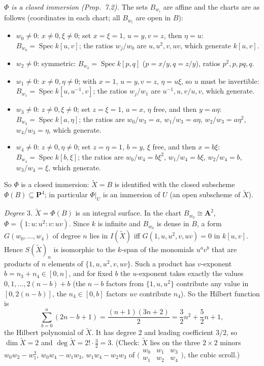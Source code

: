 \documentclass[11pt]{article}
\begin{document}
\emph{$\Phi$ is a closed immersion (Prop.~7.2).} The sets $B_{w_i}$ are affine and the charts are as follows (coordinates in each chart; all $B_{w_i}$ are open in $B$):
\begin{itemize}
\item $w_0\ne0$: $x\ne0,\xi\ne0$; set $x=\xi=1$, $u=y,v=z$, then $\eta=u$: $B_{w_0}=\operatorname{Spec}k[u,v]$; the ratios $w_j/w_0$ are $u,u^2,v,uv$, which generate $k[u,v]$.
\item $w_2\ne0$: symmetric: $B_{w_2}=\operatorname{Spec}k[p,q]$ ($p=x/y,q=z/y$), ratios $p^2,p,pq,q$.
\item $w_1\ne0$: $x\ne0,\eta\ne0$; with $x=1$, $u=y,v=z$, $\eta=u\xi$, so $u$ must be invertible: $B_{w_1}=\operatorname{Spec}k[u,u^{-1},v]$; the ratios $w_j/w_1$ are $u^{-1},u,v/u,v$, which generate.
\item $w_3\ne0$: $z\ne0,\xi\ne0$; set $z=\xi=1$, $a=x$, $\eta$ free, and then $y=a\eta$: $B_{w_3}=\operatorname{Spec}k[a,\eta]$; the ratios are $w_0/w_3=a$, $w_1/w_3=a\eta$, $w_2/w_3=a\eta^2$, $w_4/w_3=\eta$, which generate.
\item $w_4\ne0$: $z\ne0,\eta\ne0$; set $z=\eta=1$, $b=y$, $\xi$ free, and then $x=b\xi$: $B_{w_4}=\operatorname{Spec}k[b,\xi]$; the ratios are $w_0/w_4=b\xi^2$, $w_1/w_4=b\xi$, $w_2/w_4=b$, $w_3/w_4=\xi$, which generate.
\end{itemize}
So $\Phi$ is a closed immersion: $\tilde X=B$ is identified with the closed subscheme $\Phi(B)\subseteq\mathbf P^4$; in particular $\Phi|_U$ is an immersion of $U$ (an open subscheme of $\tilde X$).

\emph{Degree $3$.} $\tilde X=\Phi(B)$ is an integral surface. In the chart $B_{w_0}\cong\mathbf A^2$, $\Phi=(1:u:u^2:v:uv)$. Since $k$ is infinite and $B_{w_0}$ is dense in $B$, a form $G(w_0,\dots,w_4)$ of degree $n$ lies in $I(\tilde X)$ iff $G(1,u,u^2,v,uv)=0$ in $k[u,v]$. Hence $S(\tilde X)_n$ is isomorphic to the $k$-span of the monomials $u^av^b$ that are products of $n$ elements of $\{1,u,u^2,v,uv\}$. Such a product has $v$-exponent $b=n_3+n_4\in[0,n]$, and for fixed $b$ the $u$-exponent takes exactly the values $0,1,\dots,2(n-b)+b$ (the $n-b$ factors from $\{1,u,u^2\}$ contribute any value in $[0,2(n-b)]$, the $n_4\in[0,b]$ factors $uv$ contribute $n_4$). So the Hilbert function is
\[
\sum_{b=0}^{n}(2n-b+1)=\frac{(n+1)(3n+2)}2=\frac32n^2+\frac52n+1 ,
\]
the Hilbert polynomial of $\tilde X$. It has degree $2$ and leading coefficient $3/2$, so $\dim\tilde X=2$ and $\deg\tilde X=2!\cdot\frac32=3$. (Check: $\tilde X$ lies on the three $2\times2$ minors $w_0w_2-w_1^2$, $w_0w_4-w_1w_3$, $w_1w_4-w_2w_3$ of $\bigl(\begin{smallmatrix}w_0&w_1&w_3\\ w_1&w_2&w_4\end{smallmatrix}\bigr)$, the cubic scroll.)
\end{document}
